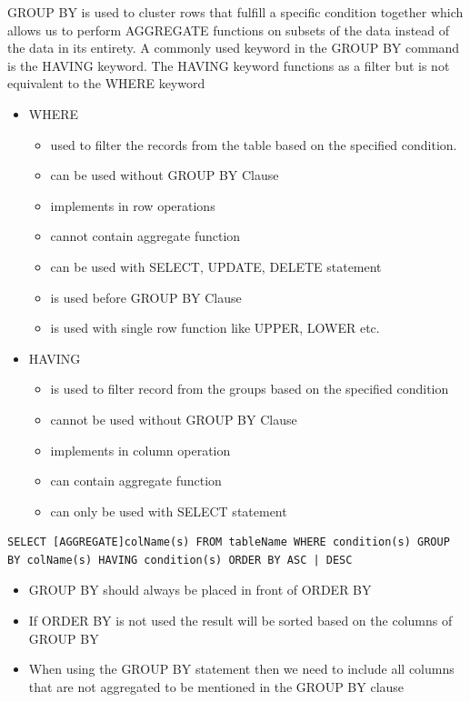 \documentclass{article}
\begin{document}
GROUP BY is used to cluster rows that fulfill a specific condition together which allows us to perform AGGREGATE functions on subsets of the data instead of the data in its entirety.
A commonly used keyword in the GROUP BY command is the HAVING keyword. The HAVING keyword functions as a filter but is not equivalent to the WHERE keyword 
\begin{itemize}
    \item WHERE
    \begin{itemize}
        \item  used to filter the records from the table based on the specified condition.
        \item can be used without GROUP BY Clause
        \item implements in row operations
        \item cannot contain aggregate function
        \item can be used with SELECT, UPDATE, DELETE statement
        \item is used before GROUP BY Clause
        \item is used with single row function like UPPER, LOWER etc.
    \end{itemize} 
    \item HAVING
    \begin{itemize}
        \item is used to filter record from the groups based on the specified condition
        \item cannot be used without GROUP BY Clause
        \item implements in column operation
        \item can contain aggregate function
        \item can only be used with SELECT statement
    \end{itemize}
\end{itemize}

\begin{lstlisting}[frame=single]
    SELECT [AGGREGATE]colName(s) FROM tableName WHERE condition(s) GROUP BY colName(s) HAVING condition(s) ORDER BY ASC | DESC
\end{lstlisting}
\begin{itemize}
    \item GROUP BY should always be placed in front of ORDER BY
    \item If ORDER BY is not used the result will be sorted based on the columns of GROUP BY
    \item When using the GROUP BY statement then we need to include all columns that are not aggregated to be mentioned in the GROUP BY clause
\end{itemize}
\end{document}
